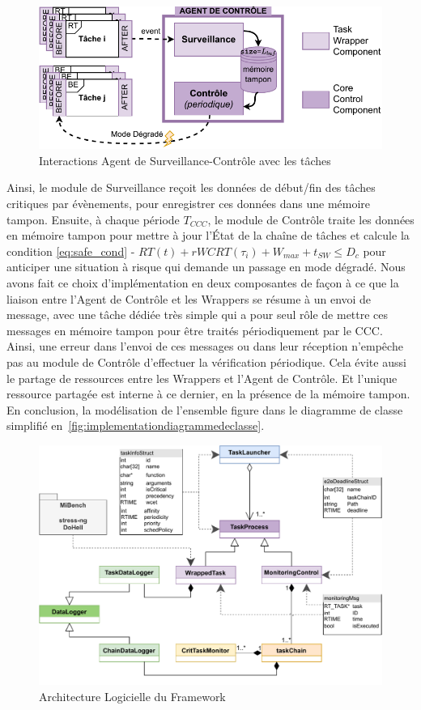 \documentclass[french, a4paper, 11pt, twoside, pdftex]{StyleThese}
\begin{document}
	\begin{figure}[ht]
		\centering
		\includegraphics[width=0.8\linewidth]{schemas/AgentSurveillance_Controle}
		\caption{Interactions Agent de Surveillance-Contrôle avec les tâches}
		\label{fig:agentsurveillancecontrole}
	\end{figure}
	Ainsi, le module de Surveillance reçoit les données de début/fin des tâches critiques par évènements, pour enregistrer ces données dans une mémoire tampon. Ensuite, à chaque période $T_{CCC}$, le module de Contrôle traite les données en mémoire tampon pour mettre à jour l’État de la chaîne de tâches et calcule la condition \autoref{eq:safe_cond} - $ RT(t) + rWCRT(\tau_i) + W_{max} + t_{SW} \leq D_c $ pour anticiper une situation à risque qui demande un passage en mode dégradé.
	Nous avons fait ce choix d'implémentation en deux composantes de façon à ce que la liaison entre l'Agent de Contrôle et les Wrappers se résume à un envoi de message, avec une tâche dédiée très simple qui a pour seul rôle de mettre ces messages en mémoire tampon pour être traités périodiquement par le CCC. Ainsi, une erreur dans l'envoi de ces messages ou dans leur réception n'empêche pas au module de Contrôle d'effectuer la vérification périodique. Cela évite aussi le partage de ressources entre les Wrappers et l'Agent de Contrôle. Et l'unique ressource partagée est interne à ce dernier, en la présence de la mémoire tampon. En conclusion, la modélisation de l'ensemble figure dans le diagramme de classe simplifié en~\autoref{fig:implementationdiagrammedeclasse}.
	
	
	\begin{figure}[ht]
		\centering
		\includegraphics[width=\linewidth]{schemas/Implementation_DiagrammeDeClasse}
		\caption{Architecture Logicielle du Framework}
		\label{fig:implementationdiagrammedeclasse}
	\end{figure}
    
\end{document}
